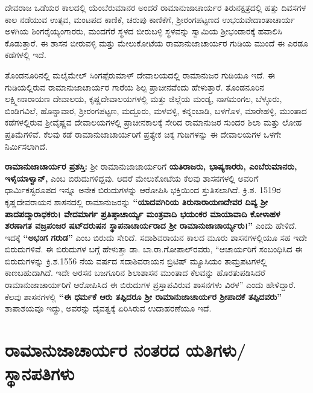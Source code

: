 ದೇವರಾಜ ಒಡೆಯರ ಕಾಲದಲ್ಲಿ ಯೆಂಬೆರುಮಾನರ ಅಂದರೆ ರಾಮಾನುಜಾಚಾರ್ಯರ ತಿರುನಕ್ಷತ್ರದಲ್ಲಿ ಹತ್ತು ದಿವಸಗಳ ಕಾಲ ನಡೆಯುವ ಉತ್ಸವ, ಮಂಟಪದ ಕಾಣಿಕೆ, ಚರುಪು ಕಾಣಿಕೆಗೆ, ಶ‍್ರೀರಂಗಪಟ್ಟಣದ ಉಭಯವೇದಾಂತಾಚಾರ್ಯ ಅಳಗಿಯ ಶಿಂಗರೈಯ್ಯಂಗಾರರು, ಮಂದಗೆರೆ ಸ್ಥಳದ ಬೀರುಬಳ್ಳಿ ಸ್ಥಳವನ್ನು ಸ್ವಾಮಿಯ ಶ‍್ರೀಭಂಡಾರಕ್ಕೆ ಹವಾಲಿಸಿ ಕೊಡುತ್ತಾರೆ. ಈ ಶಾಸನ ಬೀರುವಳ್ಳಿ ಮತ್ತು ಮೇಲುಕೋಟೆಯ ರಾಮಾನುಜಾಚಾರ್ಯರ ಗುಡಿಯ ಮುಂದೆ ಈ ಎರಡೂ ಕಡೆಗಳಲ್ಲಿ ಇದೆ.

ತೊಂಡನೂರಿನಲ್ಲಿ ಮಲೈಮೇಲ್​ ಸಿಂಗಪ್ಪೆರುಮಾಳ್​ ದೇವಾಲಯದಲ್ಲಿ ರಾಮಾನುಜರ ಗುಡಿಯೂ ಇದೆ. ಈ ಗುಡಿಯಲ್ಲಿರುವ ರಾಮಾನುಜಾಚಾರ್ಯರ ಗಾರೆಯ ಶಿಲ್ಪ ಪ್ರಾಚೀನವೆಂದು ಹೇಳುತ್ತಾರೆ. ತೊಂಡನೂರಿನ ಲಕ್ಷ್ಮೀನಾರಾಯಣ ದೇವಾಲಯ, ಕೃಷ್ಣದೇವಾಲಯಗಳಲ್ಲಿ ಮತ್ತು ಜಿಲ್ಲೆಯ ಮಂಡ್ಯ, ನಾಗಮಂಗಲ, ಬೆಳ್ಳೂರು, ಬಿಂಡಿಗವಿಲೆ, ಹೊನ್ನಾವಾರ, ಶ‍್ರೀರಂಗಪಟ್ಟಣ, ಮದ್ದೂರು, ಮಳವಳ್ಳಿ, ಕನ್ನಂಬಾಡಿ, ಬಳಗೊಳ, ಮಾರೇಹಳ್ಳಿ, ಮುಂತಾದ ಕಡೆಗಳಲ್ಲಿರುವ ಶ‍್ರೀವೈಷ್ಣವ ದೇವಾಲಯಗಳಲ್ಲಿ ಪ್ರಾಚೀನಕಾಲಕ್ಕೆ ಸೇರಿದ ರಾಮಾನುಜರ ಸುಂದರ ಶಿಲಾ ಮತ್ತು ಲೋಹ ಪ್ರತಿಮೆಗಳಿವೆ. ಕೆಲವು ಕಡೆ ರಾಮಾನುಜಾಚಾರ್ಯರಿಗೆ ಪ್ರತ್ಯೇಕ ಚಿಕ್ಕ ಗುಡಿಗಳನ್ನು ಈ ದೇವಾಲಯಗಳ ಒಳಗೇ ನಿರ್ಮಿಸಲಾಗಿದೆ.

\textbf{ರಾಮಾನುಜಾಚಾರ್ಯರ ಪ್ರಶಸ್ತಿ:} ಶ‍್ರೀ ರಾಮಾನುಜಾಚಾರ್ಯರಿಗೆ \textbf{ಯತಿರಾಜರು, ಭಾಷ್ಯಕಾರರು, ಎಂಬೆರುಮಾನರು, ಇಳೈಯಾಳ್ವಾನ್​,} ಎಂಬ ಬಿರುದುಗಳಿದ್ದವು. ಆದರೆ ಮೇಲುಕೋಟೆಯ ಕೆಲವು ಶಾಸನಗಳಲ್ಲಿ ಅವರಿಗೆ ಧಾರ್ಮಿಕಸ್ವರೂಪದ ಇನ್ನೂ ಅನೇಕ ಬಿರುದುಗಳನ್ನು ಆರೋಪಿಸಿ ಭಕ್ತಿಯಿಂದ ಸ್ತುತಿಸಲಾಗಿದೆ. ಕ್ರಿ.ಶ. 1519ರ ಕೃಷ್ಣದೇವರಾಯನ ಶಾಸನದಲ್ಲಿ ರಾಮಾನುಜರನ್ನು \textbf{“ಯಾದವಗಿರಿಯ ತಿರುನಾರಾಯಣದೇವರ ದಿವ್ಯ ಶ‍್ರೀ ಪಾದಪದ್ಮಾರಾಧಕರು। ವೇದಮಾರ್ಗ ಪ್ರತಿಷ್ಠಾಚಾರ್ಯ್ಯ ಮಂತ್ರವಾದಿ ಭಯಂಕರ ಮಾಯಾವಾದಿ ಕೋಳಾಹಳ ಶರಣಾಗತ ವಜ್ರಪಂಜರ ಷಟ್​ದರುಷನ ಸ್ಥಾಪನಾಚಾರ್ಯರಾದ ಶ‍್ರೀ ರಾಮಾನುಜಾಚಾರ್ಯ್ಯರು।”} ಎಂದು ಹೇಳಿದೆ. ಇದಕ್ಕೆ \textbf{“ಅಭಂಗ ಗರುಡ”} ಎಂಬ ಬಿರುದು ಸೇರಿದೆ. ಸದಾಶಿವರಾಯನ ಕಾಲದ ಮೂರು ಶಾಸನಗಳಲ್ಲಿಯೂ ಸಹ ಇದೇ ಬಿರುದುಗಳಿವೆ. ಈ ಬಿರುದುಗಳ ಬಗ್ಗೆ ಹೇಳುತ್ತಾ ಡಾ. ಬಾ.ರಾ.ಗೋಪಾಲ್​ರವರು, “ಆಚಾರ್ಯರಿಗೆ ಸಂಬಂಧಿಸಿದ ಈ ಬಿರುದುಗಳನ್ನು ಕ್ರಿ.ಶ.1556 ನೆಯ ವರ್ಷದ ಸದಾಶಿವರಾಯನ ಬ್ರಿಟಿಷ್​ ಮ್ಯೂಸಿಯಂ ತಾಮ್ರಪಟಗಳಲ್ಲಿ ಕಾಣಬಹುದಾಗಿದೆ. ಇದೇ ಅರಸನ ಬಜಗೂರಿನ ಶಿಲಾಶಾಸನ ಮುಂತಾದ ಕೆಲವನ್ನು ಹೊರತುಪಡಿಸಿದರೆ ರಾಮಾನುಜಾಚಾರ್ಯರಿಗೆ ಆರೋಪಿಸಿದ ಈ ಬಿರುದುಗಳ ಪ್ರಸ್ತಾಪವಿರುವ ಶಾಸನಗಳು ವಿರಳ” ಎಂದು ಹೇಳಿದ್ದಾರೆ. ಕೆಲವು ಶಾಸನಗಳಲ್ಲಿ \textbf{“ಈ ಧರ್ಮಕೆ ಆರು ತಪ್ಪಿದರೂ ಶ‍್ರೀ ರಾಮಾನುಜಾಚಾರ್ಯರ ಶ‍್ರೀಪಾದಕೆ ತಪ್ಪಿದವರು” } ಶಾಪಾಶಯವೂ ಇದ್ದು, ಅವರನ್ನು ದೈವತ್ವಕ್ಕೆ ಏರಿಸಿರುವ ಉದಾಹರಣೆಯೂ ಇದೆ.


\section{ರಾಮಾನುಜಾಚಾರ್ಯರ ನಂತರದ ಯತಿಗಳು/ ಸ್ಥಾನಪತಿಗಳು}

